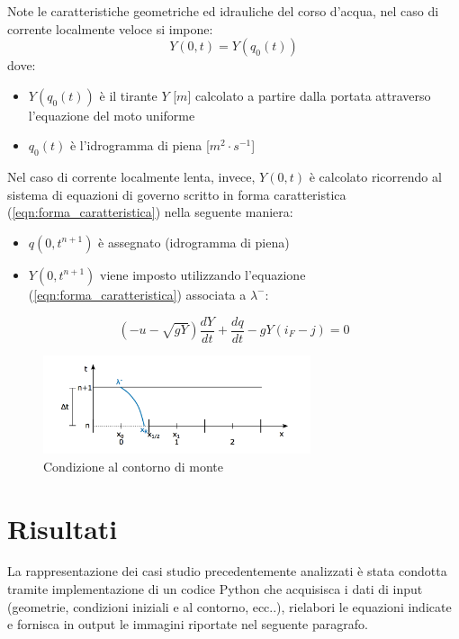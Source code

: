\documentclass[12pt]{article} %
\begin{document}
\noindent Note le caratteristiche geometriche ed idrauliche del corso d'acqua, nel caso di corrente localmente veloce si impone:
\begin{equation}
    Y(0,t)=Y(q_0(t))
\end{equation}
\noindent dove:
\begin{itemize}
    \item $Y(q_0(t))$ è il tirante $Y$ [$m$] calcolato a partire dalla portata attraverso l'equazione del moto uniforme
    \item $q_0(t)$ è l'idrogramma di piena [$m^2\cdot s^{-1}$]
\end{itemize}
\noindent Nel caso di corrente localmente lenta, invece, $Y(0,t)$ è calcolato ricorrendo al sistema di equazioni di governo scritto in forma caratteristica (\ref{eqn:forma_caratteristica}) nella seguente maniera:
\begin{itemize}
    \item $q(0,t^{n+1})$ è assegnato (idrogramma di piena)
    \item $Y(0,t^{n+1})$ viene imposto utilizzando l'equazione (\ref{eqn:forma_caratteristica}) associata a $\lambda^-$:
\end{itemize}
\begin{equation}
    \left(-u-\sqrt{gY}\right)\frac{dY}{dt}+\frac{dq}{dt}-gY\left(i_F-j\right)=0
\end{equation}
\begin{figure}
    \centering
    \includegraphics[width=0.7\textwidth]{Piede xR.png}
    \caption{Condizione al contorno di monte}
    \label{fig:piede xR}
\end{figure}

\newpage

\section {Risultati}

\noindent La rappresentazione dei casi studio precedentemente analizzati è stata condotta tramite implementazione di un codice Python che acquisisca i dati di input (geometrie, condizioni iniziali e al contorno, ecc..), rielabori le equazioni indicate e fornisca in output le immagini riportate nel seguente paragrafo.
\end{document}
